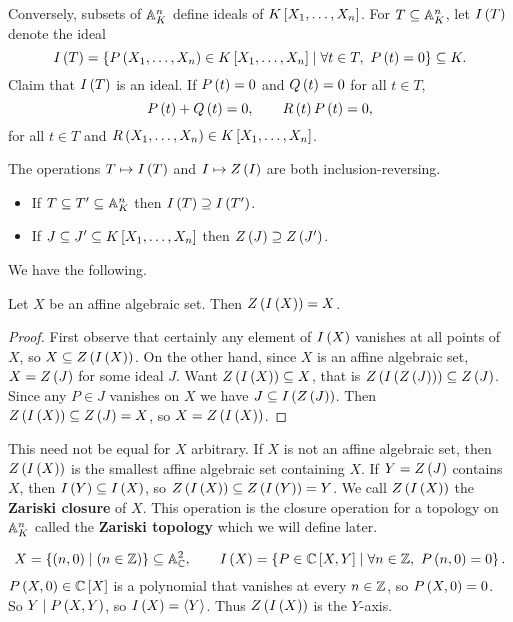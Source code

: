 Conversely, subsets of $ \A_K^n $ define ideals of $ K\sb{X_1, \dots, X_n} $. For $ T \subseteq \A_K^n $, let $ I\rb{T} $ denote the ideal
$$ I\rb{T} = \cb{P\rb{X_1, \dots, X_n} \in K\sb{X_1, \dots, X_n} \mid \forall t \in T, \ P\rb{t} = 0} \subseteq K. $$
Claim that $ I\rb{T} $ is an ideal. If $ P\rb{t} = 0 $ and $ Q\rb{t} = 0 $ for all $ t \in T $,
$$ P\rb{t} + Q\rb{t} = 0, \qquad R\rb{t}P\rb{t} = 0, $$
for all $ t \in T $ and $ R\rb{X_1, \dots, X_n} \in K\sb{X_1, \dots, X_n} $.

\begin{note*}
The operations $ T \mapsto I\rb{T} $ and $ I \mapsto Z\rb{I} $ are both inclusion-reversing.
\begin{itemize}
\item If $ T \subseteq T' \subseteq \A_K^n $ then $ I\rb{T} \supseteq I\rb{T'} $.
\item If $ J \subseteq J' \subseteq K\sb{X_1, \dots, X_n} $ then $ Z\rb{J} \supseteq Z\rb{J'} $.
\end{itemize}
\end{note*}

We have the following.

\begin{lemma}
Let $ X $ be an affine algebraic set. Then $ Z\rb{I\rb{X}} = X $.
\end{lemma}

\begin{proof}
First observe that certainly any element of $ I\rb{X} $ vanishes at all points of $ X $, so $ X \subseteq Z\rb{I\rb{X}} $. On the other hand, since $ X $ is an affine algebraic set, $ X = Z\rb{J} $ for some ideal $ J $. Want $ Z\rb{I\rb{X}} \subseteq X $, that is $ Z\rb{I\rb{Z\rb{J}}} \subseteq Z\rb{J} $. Since any $ P \in J $ vanishes on $ X $ we have $ J \subseteq I\rb{Z\rb{J}} $. Then $ Z\rb{I\rb{X}} \subseteq Z\rb{J} = X $, so $ X = Z\rb{I\rb{X}} $.
\end{proof}

This need not be equal for $ X $ arbitrary. If $ X $ is not an affine algebraic set, then $ Z\rb{I\rb{X}} $ is the smallest affine algebraic set containing $ X $. If $ Y = Z\rb{J} $ contains $ X $, then $ I\rb{Y} \subseteq I\rb{X} $, so $ Z\rb{I\rb{X}} \subseteq Z\rb{I\rb{Y}} = Y $. We call $ Z\rb{I\rb{X}} $ the \textbf{Zariski closure} of $ X $. This operation is the closure operation for a topology on $ \A_K^n $ called the \textbf{Zariski topology} which we will define later.

\begin{example*}
$$ X = \cb{\rb{n, 0} \mid \rb{n \in \Z}} \subseteq \A_\C^2, \qquad I\rb{X} = \cb{P \in \C\sb{X, Y} \mid \forall n \in \Z, \ P\rb{n, 0} = 0}. $$
$ P\rb{X, 0} \in \C\sb{X} $ is a polynomial that vanishes at every $ n \in \Z $, so $ P\rb{X, 0} = 0 $. So $ Y \mid P\rb{X, Y} $, so $ I\rb{X} = \ab{Y} $. Thus $ Z\rb{I\rb{X}} $ is the $ Y $-axis.
\end{example*}


